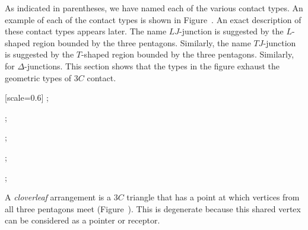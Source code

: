 As indicated in parentheses, we have named each of the various contact
types.  An example of each of the contact types is shown in
Figure~.  An exact description of these contact types
appears later.  The name $LJ$-junction is suggested by the $L$-shaped
region bounded by the three pentagons.  Similarly, the name
$TJ$-junction is suggested by the $T$-shaped region bounded by the
three pentagons.  Similarly, for $\Delta$-junctions.  This section
shows that the types in the figure exhaust the geometric types of
$3C$ contact.


{
[scale=0.6]
;
\begin{scope}[xshift=4.5cm,yshift=1.5cm]
;
\end{scope}
\begin{scope}[xshift=8cm]
;
\end{scope}
\begin{scope}[xshift=12cm]
;
\end{scope}
\begin{scope}[xshift=16cm]
;
\end{scope}
}





A {\it cloverleaf} arrangement is a $3C$ triangle that has a point at
which vertices from all three pentagons meet
(Figure~).  This is degenerate because this shared
vertex can be considered as a pointer or receptor.

